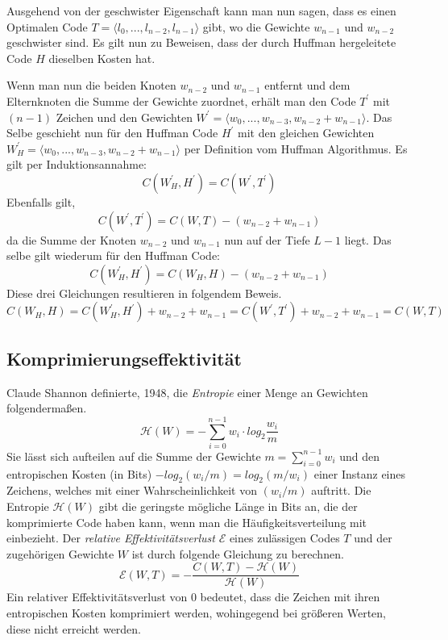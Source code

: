 \documentclass[course=erap]{aspdoc}
\begin{document}
Ausgehend von der geschwister Eigenschaft kann man nun sagen, dass es einen Optimalen Code $T = \langle l_0,..., l_{n-2}, l_{n-1} \rangle$ gibt, wo die Gewichte $w_{n-1}$ und $w_{n-2}$ geschwister sind. Es gilt nun zu Beweisen, dass der durch Huffman hergeleitete Code $H$ dieselben Kosten hat.

Wenn man nun die beiden Knoten $w_{n-2}$ und $w_{n-1}$ entfernt und dem Elternknoten die Summe der Gewichte zuordnet, erhält man den Code $T^{\prime}$ mit $(n-1)$ Zeichen und den Gewichten $W^{\prime} = \langle w_0,..., w_{n-3}, w_{n-2} + w_{n-1} \rangle$.
Das Selbe geschieht nun für den Huffman Code $H^{\prime}$ mit den gleichen Gewichten $W_H^{\prime} = \langle w_0,..., w_{n-3}, w_{n-2} + w_{n-1} \rangle $ per Definition vom Huffman Algorithmus.
Es gilt per Induktionsannahme: 
$$C(W_H^{\prime}, H^{\prime}) = C(W^\prime, T^{\prime})$$
Ebenfalls gilt,
$$ C(W^\prime, T^{\prime}) = C(W, T) - (w_{n-2} + w_{n-1})$$
da die Summe der Knoten $w_{n-2}$ und $w_{n-1}$ nun auf der Tiefe $L-1$ liegt.
Das selbe gilt wiederum für den Huffman Code:
$$ C(W_H^\prime, H^{\prime}) = C(W_H, H) - (w_{n-2} + w_{n-1})$$
Diese drei Gleichungen resultieren in folgendem Beweis.
$$ C(W_H, H) = C(W_H^\prime, H^{\prime}) + w_{n-2} + w_{n-1} = C(W^\prime, T^{\prime}) + w_{n-2} + w_{n-1} = C(W, T) $$

\subsection{Komprimierungseffektivität}

Claude Shannon definierte, 1948, die \textit{Entropie} einer Menge an Gewichten folgendermaßen. \cite{6773024}
$$ \mathcal{H}(W) = - \sum_{i=0}^{n-1} w_i \cdot log_2 \frac{w_i}{m} $$
Sie lässt sich aufteilen auf die Summe der Gewichte $m = \sum_{i=0}^{n-1} w_i$ und den entropischen Kosten (in Bits) $-log_2 (w_i/m) = log_2 (m/w_i) $ einer Instanz eines Zeichens, welches mit einer Wahrscheinlichkeit von $(w_i/m)$ auftritt.
Die Entropie $\mathcal{H}(W)$ gibt die geringste mögliche Länge in Bits an, die der komprimierte Code haben kann, wenn man die Häufigkeitsverteilung mit einbezieht.
Der \textit{relative Effektivitätsverlust} $\mathcal{E}$ eines zulässigen Codes $T$ und der zugehörigen Gewichte $W$ ist durch folgende Gleichung zu berechnen.
$$ \mathcal{E}(W, T) = - \frac{C(W,T) - \mathcal{H}(W)}{\mathcal{H}(W)} $$
Ein relativer Effektivitätsverlust von 0 bedeutet, dass die Zeichen mit ihren entropischen Kosten komprimiert werden, wohingegend bei größeren Werten, diese nicht erreicht werden.
\end{document}

